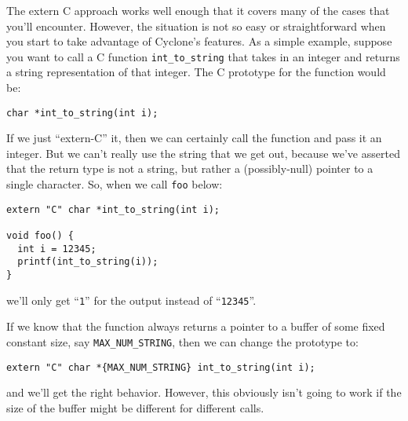 The extern C approach works well enough that it covers many
of the cases that you'll encounter.  However, the situation is
not so easy or straightforward when you start to take advantage
of Cyclone's features.  As a simple example, suppose you want
to call a C function \texttt{int\_to\_string} that takes in
an integer and returns a string representation of that integer.
The C prototype for the function would be:
\begin{verbatim}
char *int_to_string(int i);
\end{verbatim}
If we just ``extern-C'' it, then we can certainly call the function
and pass it an integer.  But we can't really use the string
that we get out, because we've asserted that the return type
is not a string, but rather a (possibly-null) pointer to a single
character.  So, when we call \texttt{foo} below:
\begin{verbatim}
extern "C" char *int_to_string(int i);

void foo() {
  int i = 12345;
  printf(int_to_string(i));
}
\end{verbatim}
we'll only get ``\texttt{1}'' for the output instead of
``\texttt{12345}''.  

If we know that the function always returns a pointer to a buffer of 
some fixed constant size, say \texttt{MAX\_NUM\_STRING}, then
we can change the prototype to:
\begin{verbatim}
extern "C" char *{MAX_NUM_STRING} int_to_string(int i);
\end{verbatim}
and we'll get the right behavior.  However, this obviously isn't
going to work if the size of the buffer might be different for
different calls.  

